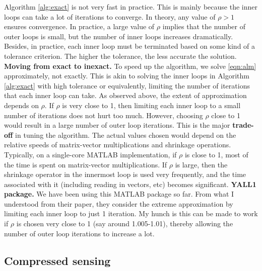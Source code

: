 \smallbreak
Algorithm \ref{alg:exact} is not very fast in practice. This is mainly because the inner loops can take a lot of iterations to converge. In theory, any value of $\rho > 1$ ensures convergence. In practice, a large value of $\rho$ implies that the number of outer loops is small, but the number of inner loops increases dramatically. Besides, in practice, each inner loop must be terminated based on some kind of a tolerance criterion. The higher the tolerance, the less accurate the solution.
\smallbreak
{\bf Moving from exact to inexact.} To speed up the algorithm, we solve \eqref{eqn:alm} approximately, not exactly. This is akin to solving the inner loops in Algorithm \ref{alg:exact} with high tolerance or equivalently, limiting the number of iterations that each inner loop can take. As observed above, the extent of approximation depends on $\rho$. If $\rho$ is very close to 1, then limiting each inner loop to a small number of iterations does not hurt too much. However, choosing $\rho$ close to 1 would result in a large number of outer loop iterations. This is the major {\bf trade-off} in tuning the algorithm. The actual values chosen would depend on the relative speeds of matrix-vector multiplications and shrinkage operations. 
\smallbreak
Typically, on a single-core MATLAB implementation, if $\rho$ is close to 1, most of the time is spent on matrix-vector multiplications. If $\rho$ is large, then the shrinkage operator in the innermost loop is used very frequently, and the time associated with it (including reading in vectors, etc) becomes significant. 
\smallbreak
{\bf YALL1 package.} We have been using this MATLAB package so far. From what I understood from their paper, they consider the extreme approximation by limiting each inner loop to just 1 iteration. My hunch is this can be made to work if $\rho$ is chosen very close to 1 (say around 1.005-1.01), thereby allowing the number of outer loop iterations to increase a lot. 

\subsection{Compressed sensing}

